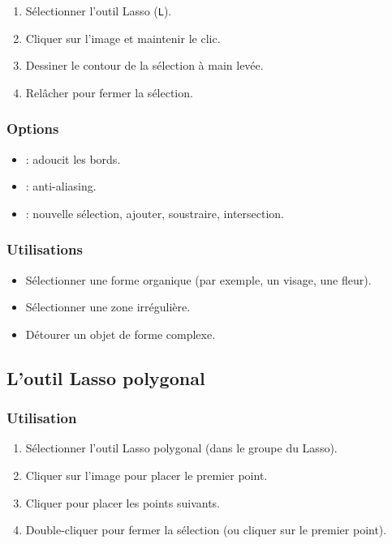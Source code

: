 \begin{enumerate}
    \item Sélectionner l'outil Lasso (\texttt{L}).
    \item Cliquer sur l'image et maintenir le clic.
    \item Dessiner le contour de la sélection à main levée.
    \item Relâcher pour fermer la sélection.
\end{enumerate}

\subsubsection{Options}

\begin{itemize}
    \item {} : adoucit les bords.
    \item {} : anti-aliasing.
    \item {} : nouvelle sélection, ajouter, soustraire, intersection.
\end{itemize}

\subsubsection{Utilisations}

\begin{itemize}
    \item Sélectionner une forme organique (par exemple, un visage, une fleur).
    \item Sélectionner une zone irrégulière.
    \item Détourer un objet de forme complexe.
\end{itemize}

\subsection{L'outil Lasso polygonal}

\subsubsection{Utilisation}

\begin{enumerate}
    \item Sélectionner l'outil Lasso polygonal (dans le groupe du Lasso).
    \item Cliquer sur l'image pour placer le premier point.
    \item Cliquer pour placer les points suivants.
    \item Double-cliquer pour fermer la sélection (ou cliquer sur le premier point).
\end{enumerate}

